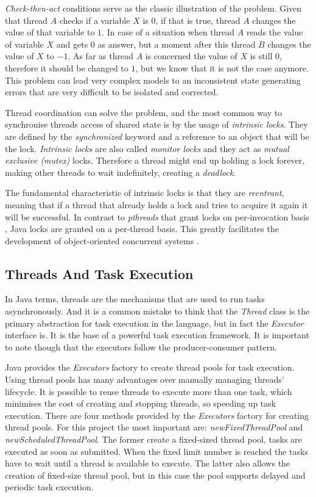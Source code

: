 \emph{Check-then-act} conditions serve as the classic illustration of the problem. Given that thread $A$ checks if a variable $X$ is $0$, if that is true, thread $A$ changes the value of that variable to $1$. In case of a situation when thread $A$ reads the value of variable $X$ and gets $0$ as answer, but a moment after this thread $B$ changes the value of $X$ to $-1$. As far as thread $A$ is concerned the value of $X$ is still $0$, therefore it should be changed to $1$, but we know that it is not the case anymore. This problem can lead very complex models to an inconsistent state generating errors that are very difficult to be isolated and corrected. 

Thread coordination can solve the problem, and the most common way to synchronise threads access of shared state is by the usage of \emph{intrinsic locks}. They are defined by the \emph{synchronized} keyword and a reference to an object that will be the lock. \emph{Intrinsic locks} are also called \emph{monitor locks} and they act as \emph{mutual exclusive (mutex)} locks. Therefore a thread might end up holding a lock forever, making other threads to wait indefinitely, creating a \emph{deadlock}. 

The fundamental characteristic of intrinsic locks is that they are \emph{reentrant}, meaning that if a thread that already holds a lock and tries to acquire it again it will be successful. In contrast to \emph{pthreads} that grant locks on per-invocation basis \cite{butenhof1997programming}, Java locks are granted on a per-thread basis. This greatly facilitates the development of object-oriented concurrent systems \cite{goetz2006java}.

\subsection{Threads And Task Execution}
\label{subsec:threads-task-exec}

In Java terms, threads are the mechanisms that are used to run tasks asynchronously. And it is a common mistake to think that the \emph{Thread} class is the primary abstraction for task execution in the language, but in fact the \emph{Executor} interface is. It is the base of a powerful task execution framework. It is important to note though that the executors follow the producer-consumer pattern.

Java provides the \emph{Executors} factory to create thread pools for task execution. Using thread pools has many advantages over manually managing threads' lifecycle. It is possible to reuse threads to execute more than one task, which minimises the cost of creating and stopping threads, so speeding up task execution. There are four methods provided by the \emph{Executors} factory for creating thread pools. For this project the most important are: \emph{newFixedThreadPool} and \emph{newScheduledThreadPool}. The former create a fixed-sized thread pool, tasks are executed as soon as submitted. When the fixed limit number is reached the tasks have to wait until a thread is available to execute. The latter also allows the creation of fixed-size thread pool, but in this case the pool supports delayed and periodic task execution.


